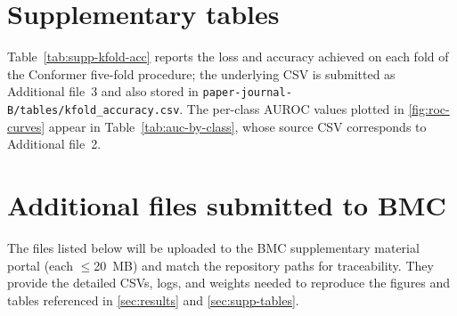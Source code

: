 \section{Supplementary tables}
\label{sec:supp-tables}
Table~\ref{tab:supp-kfold-acc} reports the loss and accuracy achieved on each fold of the Conformer five-fold procedure; the underlying CSV is submitted as Additional file~3 and also stored in \texttt{paper-journal-B/tables/kfold\_accuracy.csv}. The per-class AUROC values plotted in \autoref{fig:roc-curves} appear in Table~\ref{tab:auc-by-class}, whose source CSV corresponds to Additional file~2.




\section{Additional files submitted to BMC}
The files listed below will be uploaded to the BMC supplementary material portal (each \( \leq \)20~MB) and match the repository paths for traceability. They provide the detailed CSVs, logs, and weights needed to reproduce the figures and tables referenced in \autoref{sec:results} and \autoref{sec:supp-tables}.
